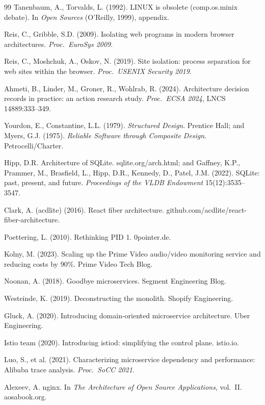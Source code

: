 \documentclass[11pt,oneside]{article}
\theoremstyle{definition}
\begin{document}
\begin{thebibliography}{99}
 Tanenbaum, A., Torvalds, L. (1992). LINUX is obsolete
(comp.os.minix debate). In \emph{Open Sources} (O'Reilly, 1999), appendix.

 Reis, C., Gribble, S.D. (2009). Isolating web programs in modern browser
architectures. \emph{Proc.\ EuroSys 2009}.

 Reis, C., Moshchuk, A., Oskov, N. (2019). Site isolation: process separation
for web sites within the browser. \emph{Proc.\ USENIX Security 2019}.

 Ahmeti, B., Linder, M., Groner, R., Wohlrab, R. (2024). Architecture decision
records in practice: an action research study. \emph{Proc.\ ECSA 2024}, LNCS 14889:333--349.

 Yourdon, E., Constantine, L.L. (1979). \emph{Structured Design}.
Prentice Hall; and Myers, G.J. (1975). \emph{Reliable Software through Composite Design}.
Petrocelli/Charter.

 Hipp, D.R. Architecture of SQLite. sqlite.org/arch.html; and Gaffney, K.P.,
Prammer, M., Brasfield, L., Hipp, D.R., Kennedy, D., Patel, J.M. (2022). SQLite: past, present,
and future. \emph{Proceedings of the VLDB Endowment} 15(12):3535--3547.

 Clark, A. (acdlite) (2016). React fiber architecture.
github.com/acdlite/react-fiber-architecture.

 Poettering, L. (2010). Rethinking PID 1. 0pointer.de.

 Kolny, M. (2023). Scaling up the Prime Video audio/video monitoring
service and reducing costs by 90\%. Prime Video Tech Blog.

 Noonan, A. (2018). Goodbye microservices. Segment Engineering Blog.

 Westeinde, K. (2019). Deconstructing the monolith. Shopify Engineering.

 Gluck, A. (2020). Introducing domain-oriented microservice architecture.
Uber Engineering.

 Istio team (2020). Introducing istiod: simplifying the control plane.
istio.io.

 Luo, S., et al. (2021). Characterizing microservice dependency and
performance: Alibaba trace analysis. \emph{Proc.\ SoCC 2021}.

 Alexeev, A. nginx. In \emph{The Architecture of Open Source Applications},
vol.~II. aosabook.org.


\end{thebibliography}
\end{document}

